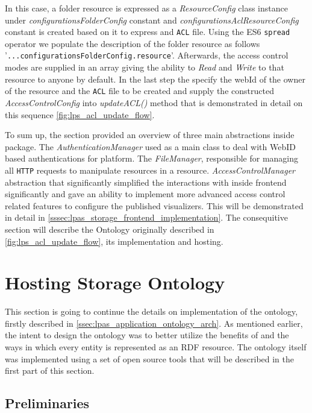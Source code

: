 In this case, a folder resource is expressed as a \textit{ResourceConfig} class instance under \textit{configurationsFolderConfig} constant and \textit{configurationsAclResourceConfig} constant is created based on it to express and \texttt{ACL} file. Using the ES6 \texttt{spread} operator we populate the description of the folder resource as follows '\texttt{...configurationsFolderConfig.resource}'. Afterwards, the access control modes are supplied in an array giving the ability to \textit{Read} and \textit{Write} to that resource to anyone by default. In the last step the specify the webId of the owner of the resource and the \texttt{ACL} file to be created and supply the constructed \textit{AccessControlConfig} into \textit{updateACL()} method that is demonstrated in detail on this sequence \autoref{fig:lps_acl_update_flow}.

To sum up, the section provided an overview of three main abstractions inside \lpas{} package. The \textit{AuthenticationManager} used as a main class to deal with WebID based authentications for \lpa{} platform. The \textit{FileManager}, responsible for managing all \texttt{HTTP} requests to manipulate resources in a \solid{} resource. \textit{AccessControlManager} abstraction that significantly simplified the interactions with \solid{} inside \lpa{} frontend significantly and gave an ability to implement more advanced access control related features to configure the published \lpa{} visualizers. This will be demonstrated in detail in \autoref{sssec:lpas_storage_frontend_implementation}. The consequitive section will describe the \lpas{} Ontology originally described in \autoref{fig:lps_acl_update_flow}, its implementation and hosting.

\section{Hosting Storage Ontology}

This section is going to continue the details on implementation of the \lpas{} ontology, firstly described in \autoref{ssec:lpas_application_ontology_arch}. As mentioned earlier, the intent to design the ontology was to better utilize the benefits of \solid{} and the ways in which every entity is represented as an RDF resource. The ontology itself was implemented using a set of open source tools that will be described in the first part of this section. 

\subsection{Preliminaries}

